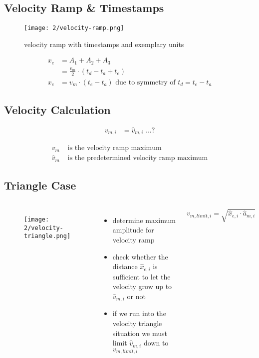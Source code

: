 \documentclass[%
  professionalfonts,%
  xcolor={%
    usenames,%
    dvipsnames,%
    svgnames,%
    table,%
    hyperref%
  }%
]{beamer}
\begin{document}
\subsection{Velocity Ramp \& Timestamps}
\begin{frame}
	\begin{figure}[h]
		\texttt{[image: 2/velocity-ramp.png]}
		\caption{velocity ramp with timestamps and exemplary units}
		\label{fig:velocity-profile}
	\end{figure}
	\begin{align*}
	x_{e} & = A_{1} + A_{2} + A_{3} \\
	& = \frac{v_{m}}{2} \cdot (t_{d} - t_{a} + t_{e}) \\
	x_{e} & = v_{m} \cdot (t_{e} - t_{a}) \text{ due to symmetry of } t_{d} = t_{e} - t_{a}
	\end{align*}
\end{frame}

\subsection{Velocity Calculation}
\begin{frame}
	\begin{align*}
	v_{m,i } & = \hat{v}_{m,i} \text{ ...?}
	\end{align*}
	
	\begin{align*}
	v_{m} & \text{ is the velocity ramp maximum} \\
	\hat{v}_{m} & \text{ is the predetermined velocity ramp maximum}
	\end{align*}
\end{frame}

\subsection{Triangle Case}
\begin{frame}
  \begin{columns}
    \begin{figure}[h]
      \texttt{[image: 2/velocity-triangle.png]}
      \label{fig:velocity-triangle}
    \end{figure}
    \begin{itemize}
      \item determine maximum amplitude for velocity ramp
      \item check whether the distance $\hat{x}_{e,i}$ is sufficient to let the velocity grow up to $\hat{v}_{m,i}$ or not
      \item if we run into the velocity triangle situation we must limit $\hat{v}_{m,i}$ down to $v_{m,limit,i}$
    \end{itemize}
    
    \begin{equation*}
    v_{m,limit,i} = \sqrt{\hat{x}_{e,i} \cdot \hat{a}_{m,i}}
    \end{equation*}
  \end{columns}
\end{frame}
\end{document}
